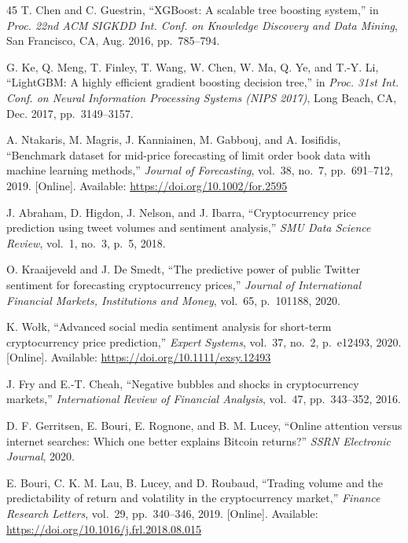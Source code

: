 \documentclass[conference]{IEEEtran}
\begin{document}
\begin{thebibliography}{45}
T. Chen and C. Guestrin, ``XGBoost: A scalable tree boosting system,'' in \textit{Proc. 22nd ACM SIGKDD Int. Conf. on Knowledge Discovery and Data Mining}, San Francisco, CA, Aug. 2016, pp.~785--794.

G. Ke, Q. Meng, T. Finley, T. Wang, W. Chen, W. Ma, Q. Ye, and T.-Y. Li, ``LightGBM: A highly efficient gradient boosting decision tree,'' in \textit{Proc. 31st Int. Conf. on Neural Information Processing Systems (NIPS 2017)}, Long Beach, CA, Dec. 2017, pp.~3149--3157.

A. Ntakaris, M. Magris, J. Kanniainen, M. Gabbouj, and A. Iosifidis, ``Benchmark dataset for mid-price forecasting of limit order book data with machine learning methods,'' \textit{Journal of Forecasting}, vol.~38, no.~7, pp.~691--712, 2019. [Online]. Available: \url{https://doi.org/10.1002/for.2595}

J. Abraham, D. Higdon, J. Nelson, and J. Ibarra, ``Cryptocurrency price prediction using tweet volumes and sentiment analysis,'' \textit{SMU Data Science Review}, vol.~1, no.~3, p.~5, 2018.

O. Kraaijeveld and J. De Smedt, ``The predictive power of public Twitter sentiment for forecasting cryptocurrency prices,'' \textit{Journal of International Financial Markets, Institutions and Money}, vol.~65, p.~101188, 2020.

K. Wołk, ``Advanced social media sentiment analysis for short-term cryptocurrency price prediction,'' \textit{Expert Systems}, vol.~37, no.~2, p.~e12493, 2020. [Online]. Available: \url{https://doi.org/10.1111/exsy.12493}

J. Fry and E.-T. Cheah, ``Negative bubbles and shocks in cryptocurrency markets,'' \textit{International Review of Financial Analysis}, vol.~47, pp.~343--352, 2016.

D. F. Gerritsen, E. Bouri, E. Rognone, and B. M. Lucey, ``Online attention versus internet searches: Which one better explains Bitcoin returns?'' \textit{SSRN Electronic Journal}, 2020.

E. Bouri, C. K. M. Lau, B. Lucey, and D. Roubaud, ``Trading volume and the predictability of return and volatility in the cryptocurrency market,'' \textit{Finance Research Letters}, vol.~29, pp.~340--346, 2019. [Online]. Available: \url{https://doi.org/10.1016/j.frl.2018.08.015}

\end{thebibliography}
\end{document}
